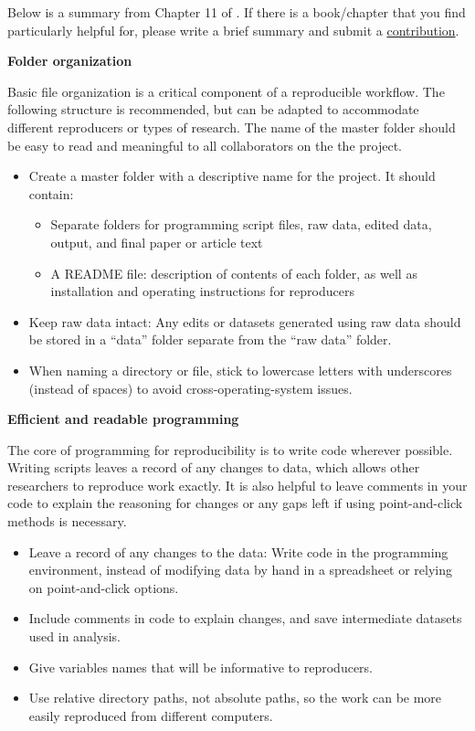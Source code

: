 \documentclass[]{book}
\providecommand{\tightlist}{%
  \setlength{\itemsep}{0pt}\setlength{\parskip}{0pt}}
\begin{document}
Below is a summary from Chapter 11 of \citet{christensen2019transparent}. If there is a book/chapter that you find particularly helpful for, please write a brief summary and submit a \protect\hyperlink{contrib-guide}{contribution}.

\textbf{Folder organization}

Basic file organization is a critical component of a reproducible workflow. The following structure is recommended, but can be adapted to accommodate different reproducers or types of research. The name of the master folder should be easy to read and meaningful to all collaborators on the the project.

\begin{itemize}
\tightlist
\item
  Create a master folder with a descriptive name for the project. It should contain:

  \begin{itemize}
  \tightlist
  \item
    Separate folders for programming script files, raw data, edited data, output, and final paper or article text
  \item
    A README file: description of contents of each folder, as well as installation and operating instructions for reproducers
  \end{itemize}
\item
  Keep raw data intact: Any edits or datasets generated using raw data should be stored in a ``data'' folder separate from the ``raw data'' folder.
\item
  When naming a directory or file, stick to lowercase letters with underscores (instead of spaces) to avoid cross-operating-system issues.
\end{itemize}

\textbf{Efficient and readable programming}

The core of programming for reproducibility is to write code wherever possible. Writing scripts leaves a record of any changes to data, which allows other researchers to reproduce work exactly. It is also helpful to leave comments in your code to explain the reasoning for changes or any gaps left if using point-and-click methods is necessary.

\begin{itemize}
\tightlist
\item
  Leave a record of any changes to the data: Write code in the programming environment, instead of modifying data by hand in a spreadsheet or relying on point-and-click options.
\item
  Include comments in code to explain changes, and save intermediate datasets used in analysis.
\item
  Give variables names that will be informative to reproducers.
\item
  Use relative directory paths, not absolute paths, so the work can be more easily reproduced from different computers.
\end{itemize}
\end{document}
